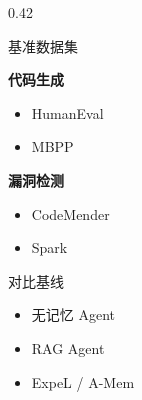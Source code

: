 \documentclass[aspectratio=169,10pt]{beamer}
\begin{document}
\begin{frame}
\begin{columns}[T]
\begin{column}{0.42\textwidth}
\begin{block}{基准数据集}
        \vspace{0.2cm}

        \textbf{代码生成}
        \begin{itemize}
          \item HumanEval
          \item MBPP
        \end{itemize}

        \vspace{0.2cm}

        \textbf{漏洞检测}
        \begin{itemize}
          \item CodeMender
          \item Spark
        \end{itemize}
      \end{block}

      \vspace{0.2cm}

      \begin{alertblock}{对比基线}
        \tiny
        \begin{itemize}
          \item 无记忆 Agent
          \item RAG Agent
          \item ExpeL / A-Mem
        \end{itemize}
      \end{alertblock}
    \end{column}
  \end{columns}
\end{frame}
\end{document}
